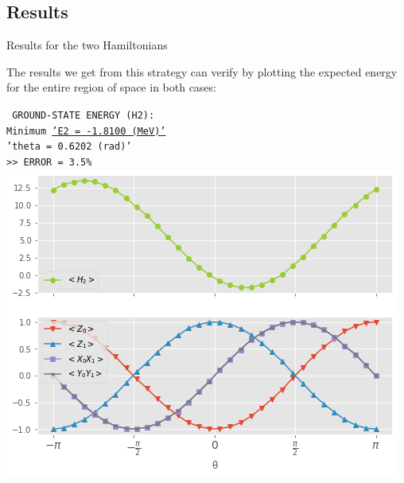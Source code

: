 \documentclass[9pt, handout, aspectratio=169]{beamer}		%
\begin{document}

	\subsection{Results}

	\begin{frame}{Results for the two Hamiltonians}

		The results we get from this strategy can verify by plotting the expected energy for the entire region of space in both cases:

		\begin{multicols}{2}

			\begin{center}
				\texttt{ \small
					GROUND-STATE ENERGY (H2): \\
					Minimum \underline{'E2 = -1.8100 (MeV)'} \\
					'theta = 0.6202 (rad)' \\
					>> ERROR = 3.5\% } \\
				\smallskip
				\includegraphics[height=.40\paperheight]{Figures/h2_result}
			\end{center}

			\columnbreak


\end{multicols}
\end{frame}
\end{document}
